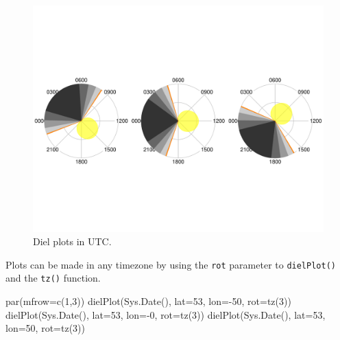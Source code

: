 \documentclass[
]{book}
\newenvironment{Shaded}{\begin{snugshade}}{\end{snugshade}}
\newcommand{\AttributeTok}[1]{\textcolor[rgb]{0.77,0.63,0.00}{#1}}
\newcommand{\DecValTok}[1]{\textcolor[rgb]{0.00,0.00,0.81}{#1}}
\newcommand{\FunctionTok}[1]{\textcolor[rgb]{0.00,0.00,0.00}{#1}}
\newcommand{\NormalTok}[1]{#1}
\newcommand{\SpecialCharTok}[1]{\textcolor[rgb]{0.00,0.00,0.00}{#1}}
\begin{document}
\begin{figure}

{\centering \includegraphics[width=0.9\linewidth]{_main_files/figure-latex/diel-plot-no-tz-1} 

}

\caption{Diel plots in UTC.}\label{fig:diel-plot-no-tz}
\end{figure}

Plots can be made in any timezone by using the \texttt{rot} parameter to \texttt{dielPlot()} and the \texttt{tz()} function.

\begin{Shaded}
\begin{Highlighting}[]
\FunctionTok{par}\NormalTok{(}\AttributeTok{mfrow=}\FunctionTok{c}\NormalTok{(}\DecValTok{1}\NormalTok{,}\DecValTok{3}\NormalTok{))}
\FunctionTok{dielPlot}\NormalTok{(}\FunctionTok{Sys.Date}\NormalTok{(), }\AttributeTok{lat=}\DecValTok{53}\NormalTok{, }\AttributeTok{lon=}\SpecialCharTok{{-}}\DecValTok{50}\NormalTok{, }\AttributeTok{rot=}\FunctionTok{tz}\NormalTok{(}\DecValTok{3}\NormalTok{))}
\FunctionTok{dielPlot}\NormalTok{(}\FunctionTok{Sys.Date}\NormalTok{(), }\AttributeTok{lat=}\DecValTok{53}\NormalTok{, }\AttributeTok{lon=}\SpecialCharTok{{-}}\DecValTok{0}\NormalTok{, }\AttributeTok{rot=}\FunctionTok{tz}\NormalTok{(}\DecValTok{3}\NormalTok{))}
\FunctionTok{dielPlot}\NormalTok{(}\FunctionTok{Sys.Date}\NormalTok{(), }\AttributeTok{lat=}\DecValTok{53}\NormalTok{, }\AttributeTok{lon=}\DecValTok{50}\NormalTok{, }\AttributeTok{rot=}\FunctionTok{tz}\NormalTok{(}\DecValTok{3}\NormalTok{))}
\end{Highlighting}
\end{Shaded}
\end{document}

